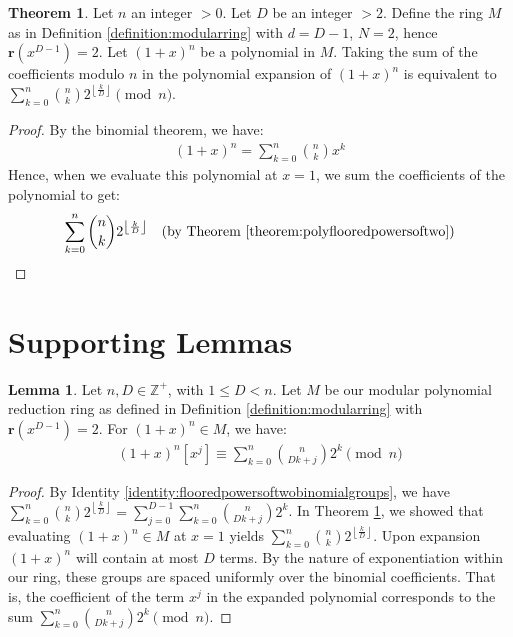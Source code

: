 \documentclass{article}
\theoremstyle{plain}
\theoremstyle{definition}
\newtheorem{theorem}{Theorem}
\newtheorem{lemma}{Lemma}
\newcommand{\floor}[1]{\left\lfloor #1 \right\rfloor}
\newcommand{\redu}{\textbf{r}}
\newcommand{\Z}{\mathbb{Z}}
\begin{document}
\begin{theorem} \label{theorem:polybinomialtransform}
Let $n$ an integer $>0$. Let $D$ be an integer $>2$. Define the ring $M$ as in Definition \ref{definition:modularring} with $d=D-1$, $N=2$, hence $\redu(x^{D-1}) = 2$. Let $(1 + x)^n$ be a polynomial in $M$. Taking the sum of the coefficients modulo $n$ in the polynomial expansion of $ (1 + x)^n $ is equivalent to $\sum_{k=0}^{n} \binom{n}{k} 2^{\floor{\frac{k}{D}}} \pmod{n}$.
\end{theorem}
\begin{proof}
By the binomial theorem, we have:
\begin{align}
    (1 + x)^n = \sum_{k=0}^{n} \binom{n}{k} x^{k}
\end{align}
Hence, when we evaluate this polynomial at \( x = 1 \), we sum the coefficients of the polynomial to get:
\begin{align}
    \sum_{k=0}^{n} \binom{n}{k} 2^{\floor{\frac{k}{D}}} \quad \text{(by Theorem \ref{theorem:polyflooredpowersoftwo})}
\end{align}
\end{proof}

\section{Supporting Lemmas}

\begin{lemma} \label{lemma:polytermcoeffs}
Let $n, D \in \Z^+$, with $1 \leq D < n$. Let $M$ be our modular polynomial reduction ring as defined in Definition \ref{definition:modularring} with $\redu(x^{D-1}) = 2$. For $(1 + x)^n \in M$, we have:
\begin{align}
    (1 + x)^n[x^j] \equiv \sum_{k=0}^{n} \binom{n}{D k + j} 2^{k} \pmod{n}
\end{align}
\end{lemma}
\begin{proof}
By Identity \ref{identity:flooredpowersoftwobinomialgroups}, we have $\sum_{k=0}^{n} \binom{n}{k} 2^{\floor{\frac{k}{D}}} = \sum_{j=0}^{D-1} \sum_{k=0}^{n} \binom{n}{D k + j} 2^{k}$. In Theorem \ref{theorem:polybinomialtransform}, we showed that evaluating $(1+x)^n \in M$ at $x=1$ yields $\sum_{k=0}^{n} \binom{n}{k} 2^{\floor{\frac{k}{D}}}$. Upon expansion $(1+x)^n$ will contain at most $D$ terms. By the nature of exponentiation within our ring, these groups are spaced uniformly over the binomial coefficients. That is, the coefficient of the term $x^j$ in the expanded polynomial corresponds to the sum $\sum_{k=0}^{n} \binom{n}{D k + j} 2^{k} \pmod{n}$.
\end{proof}
\end{document}
